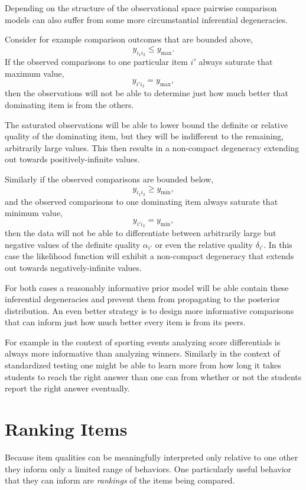 \documentclass[
  letterpaper,
  DIV=11,
  numbers=noendperiod]{scrartcl}
\begin{document}
Depending on the structure of the observational space pairwise
comparison models can also suffer from some more circumstantial
inferential degeneracies.

Consider for example comparison outcomes that are bounded above, \[
y_{i_{1} i_{2}} \le y_{\max}.
\] If the observed comparisons to one particular item \(i'\) always
saturate that maximum value, \[
y_{i' i_{2}} = y_{\max},
\] then the observations will not be able to determine just how much
better that dominating item is from the others.

The saturated observations will be able to lower bound the definite or
relative quality of the dominating item, but they will be indifferent to
the remaining, arbitrarily large values. This then results in a
non-compact degeneracy extending out towards positively-infinite values.

Similarly if the observed comparisons are bounded below, \[
y_{i_{1} i_{2}} \ge y_{\min},
\] and the observed comparisons to one dominating item always saturate
that minimum value, \[
y_{i' i_{2}} = y_{\min},
\] then the data will not be able to differentiate between arbitrarily
large but negative values of the definite quality \(\alpha_{i'}\) or
even the relative quality \(\delta_{i'}\). In this case the likelihood
function will exhibit a non-compact degeneracy that extends out towards
negatively-infinite values.

For both cases a reasonably informative prior model will be able contain
these inferential degeneracies and prevent them from propagating to the
posterior distribution. An even better strategy is to design more
informative comparisons that can inform just how much better every item
is from its peers.

For example in the context of sporting events analyzing score
differentials is always more informative than analyzing winners.
Similarly in the context of standardized testing one might be able to
learn more from how long it takes students to reach the right answer
than one can from whether or not the students report the right answer
eventually.

\section{Ranking Items}\label{ranking-items}

Because item qualities can be meaningfully interpreted only relative to
one other they inform only a limited range of behaviors. One
particularly useful behavior that they can inform are \emph{rankings} of
the items being compared.
\end{document}
